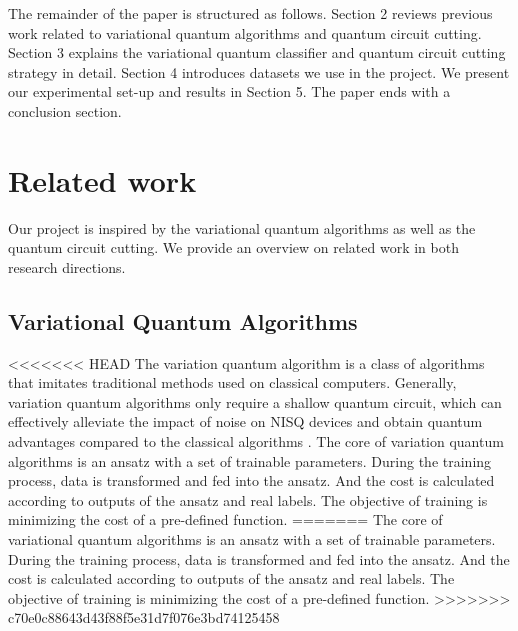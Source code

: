 \documentclass[sigconf]{acmart}
\begin{document}
The remainder of the paper is structured as follows. Section 2 reviews previous work related to variational quantum algorithms and quantum circuit cutting. Section 3 explains the variational quantum classifier and quantum circuit cutting strategy in detail. Section 4 introduces datasets we use in the project. We present our experimental set-up and results in Section 5. The paper ends with a conclusion section.

\section{Related work}

Our project is inspired by the variational quantum algorithms as well as the quantum circuit cutting. We provide an overview on related work in both research directions.

\subsection{Variational Quantum Algorithms}
<<<<<<< HEAD
The variation quantum algorithm is a class of algorithms that imitates traditional methods used on classical computers. Generally, variation quantum algorithms only require a shallow quantum circuit, which can effectively alleviate the impact of noise on NISQ devices and obtain quantum advantages compared to the classical algorithms \cite{cerezo2021}. The core of variation quantum algorithms is an ansatz with a set of trainable parameters. During the training process, data is transformed and fed into the ansatz. And the cost is calculated according to outputs of the ansatz and real labels. The objective of training is minimizing the cost of a pre-defined function.
=======
The core of variational quantum algorithms is an ansatz with a set of trainable parameters. During the training process, data is transformed and fed into the ansatz. And the cost is calculated according to outputs of the ansatz and real labels. The objective of training is minimizing the cost of a pre-defined function.
>>>>>>> c70e0c88643d43f88f5e31d7f076e3bd74125458
\end{document}
